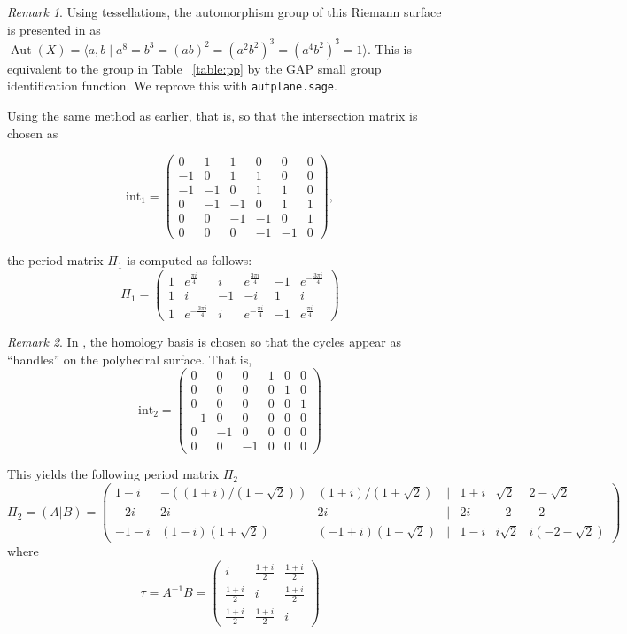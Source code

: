 \documentclass[12pt,reqno]{amsart}
\DeclareMathOperator{\Aut}{Aut}
\theoremstyle{definition}
\theoremstyle{remark}
\newtheorem*{remark}{Remark}
\begin{document}
\begin{remark} Using tessellations, the automorphism group of this Riemann surface is presented in \cite{dami} as $\Aut(X) = \langle a, b \mid a^8 = b^3 = (ab) ^2 = (a^2b^2)^3 = (a^4b^2)^3 = 1 \rangle$. This is equivalent to the group in Table ~\ref{table:pp} by the GAP small group identification function. We reprove this with \texttt{autplane.sage}. \end{remark}


Using the same method as earlier, that is, so that the intersection matrix is chosen as

$$\textrm{int}_1 = \begin{pmatrix} 0 & 1 & 1 & 0 & 0 & 0 \\
 -1 & 0 & 1 & 1 & 0 & 0 \\
 -1 & -1 & 0 & 1 & 1 & 0 \\
 0 & -1 & -1 & 0 & 1 & 1 \\
 0 & 0 & -1 & -1 & 0 & 1 \\
 0 & 0 & 0 & -1 & -1 & 0 \end{pmatrix},$$

the period matrix $\Pi_1$ is computed as follows: 
$$\Pi_1 = \left(
\begin{array}{cccccc}
 1 & e^{\frac{\pi i}{4}} & i & e^{\frac{3 \pi i}{4}} & -1 & e^{-\frac{3 \pi i}{4}} \\
 1 & i & -1 & -i & 1 & i \\
 1 & e^{-\frac{3 \pi i}{4}} & i & e^{-\frac{\pi i}{4}} & -1 & e^{\frac{\pi i}{4}} 

\end{array}
\right)$$
 
\begin{remark} In \cite{dthesis}, the homology basis is chosen so that the cycles appear as ``handles'' on the polyhedral surface. That is, 
$$\textrm{int}_2 = \begin{pmatrix} 0 & 0 & 0 & 1 & 0 & 0 \\
 0 & 0 & 0 & 0 & 1 & 0 \\
 0 & 0 & 0 & 0 & 0 & 1 \\
 -1 & 0 & 0 & 0 & 0 & 0 \\
 0 & -1 & 0 & 0 & 0 & 0 \\
 0 & 0 & -1 & 0 & 0 & 0\end{pmatrix}$$


This yields the following period matrix $\Pi_2$ 
$$\Pi_2 = (A|B) = \begin{pmatrix}  1 - i& -((1 + i)/(1 + \sqrt{2}))& (1 + i)/(1 + \sqrt{2})& | & 1 + i & \sqrt{2}& 2 - \sqrt{2} \\  -2i& 2i& 2i& | & 2i& -2& -2\\ -1 - i & (1 - i)(1 + \sqrt{2})& (-1 + i)(1 + \sqrt{2})& | & 1 - i& i\sqrt{2}& i(-2 - \sqrt{2})  \end{pmatrix} $$ where $$\tau = A^{-1}B = \begin{pmatrix}i & \frac{1 + i}{2} & \frac{1 + i}{2}\\
\frac{1 + i}{2} & i & \frac{1 + i}{2}\\
\frac{1 + i}{2} & \frac{1 + i}{2} & i\end{pmatrix}$$
\end{remark}
\end{document}
